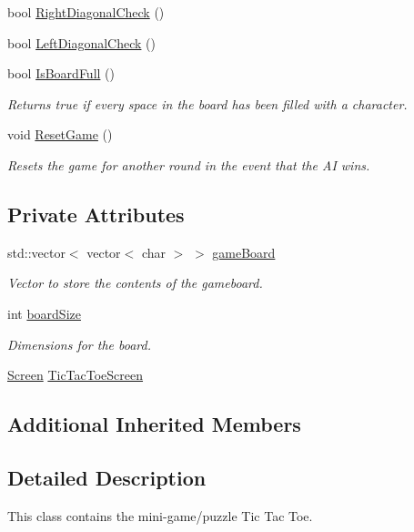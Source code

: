 \begin{DoxyCompactItemize}
\item 
bool \hyperlink{classTicTacToe_a3b96d4252e042b2e85bb0bc9a501bc0c}{Right\-Diagonal\-Check} ()
\item 
bool \hyperlink{classTicTacToe_ad65a6d8382d7a59c68a6778caea91d78}{Left\-Diagonal\-Check} ()
\item 
bool \hyperlink{classTicTacToe_a7bb5521e85c2a1d4c61ab405d03a62c5}{Is\-Board\-Full} ()
\begin{DoxyCompactList}\small\item\em Returns true if every space in the board has been filled with a character. \end{DoxyCompactList}\item 
void \hyperlink{classTicTacToe_a36b58f33246558d0b7b34412b641cff6}{Reset\-Game} ()
\begin{DoxyCompactList}\small\item\em Resets the game for another round in the event that the A\-I wins. \end{DoxyCompactList}\end{DoxyCompactItemize}
\subsection*{Private Attributes}
\begin{DoxyCompactItemize}
\item 
std\-::vector$<$ vector$<$ char $>$ $>$ \hyperlink{classTicTacToe_a9e4321945ff098996c42cc56936445b9}{game\-Board}
\begin{DoxyCompactList}\small\item\em Vector to store the contents of the gameboard. \end{DoxyCompactList}\item 
int \hyperlink{classTicTacToe_a0aab68285cb8b8f5ce6159ed5cfc8bbd}{board\-Size}
\begin{DoxyCompactList}\small\item\em Dimensions for the board. \end{DoxyCompactList}\item 
\hyperlink{classScreen}{Screen} \hyperlink{classTicTacToe_a6749582a8480be3cbae920f8f2cca8ce}{Tic\-Tac\-Toe\-Screen}
\end{DoxyCompactItemize}
\subsection*{Additional Inherited Members}


\subsection{Detailed Description}
This class contains the mini-\/game/puzzle Tic Tac Toe. 

